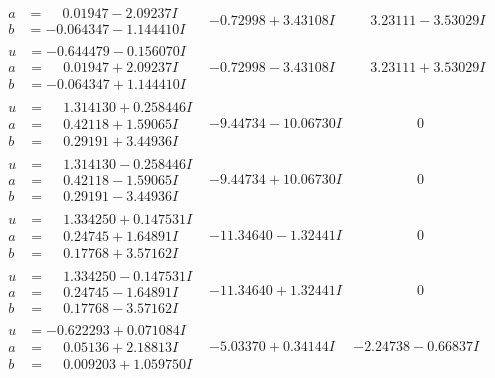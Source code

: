 \documentclass[1p]{elsarticle_modified}
\theoremstyle{definition}
\begin{document}
$$\begin{array}{c|c|c}
\begin{aligned}
a &= \phantom{-}0.01947 - 2.09237 I \\
b &= -0.064347 - 1.144410 I\end{aligned}
 & -0.72998 + 3.43108 I & \phantom{-}3.23111 - 3.53029 I \\ \hline\begin{aligned}
u &= -0.644479 - 0.156070 I \\
a &= \phantom{-}0.01947 + 2.09237 I \\
b &= -0.064347 + 1.144410 I\end{aligned}
 & -0.72998 - 3.43108 I & \phantom{-}3.23111 + 3.53029 I \\ \hline\begin{aligned}
u &= \phantom{-}1.314130 + 0.258446 I \\
a &= \phantom{-}0.42118 + 1.59065 I \\
b &= \phantom{-}0.29191 + 3.44936 I\end{aligned}
 & -9.44734 - 10.06730 I & \phantom{-0.000000 } 0 \\ \hline\begin{aligned}
u &= \phantom{-}1.314130 - 0.258446 I \\
a &= \phantom{-}0.42118 - 1.59065 I \\
b &= \phantom{-}0.29191 - 3.44936 I\end{aligned}
 & -9.44734 + 10.06730 I & \phantom{-0.000000 } 0 \\ \hline\begin{aligned}
u &= \phantom{-}1.334250 + 0.147531 I \\
a &= \phantom{-}0.24745 + 1.64891 I \\
b &= \phantom{-}0.17768 + 3.57162 I\end{aligned}
 & -11.34640 - 1.32441 I & \phantom{-0.000000 } 0 \\ \hline\begin{aligned}
u &= \phantom{-}1.334250 - 0.147531 I \\
a &= \phantom{-}0.24745 - 1.64891 I \\
b &= \phantom{-}0.17768 - 3.57162 I\end{aligned}
 & -11.34640 + 1.32441 I & \phantom{-0.000000 } 0 \\ \hline\begin{aligned}
u &= -0.622293 + 0.071084 I \\
a &= \phantom{-}0.05136 + 2.18813 I \\
b &= \phantom{-}0.009203 + 1.059750 I\end{aligned}
 & -5.03370 + 0.34144 I & -2.24738 - 0.66837 I\\

\end{array}$$
\end{document}
